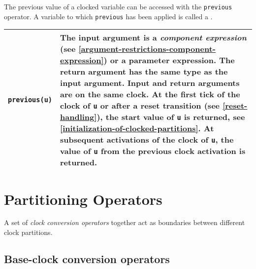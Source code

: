 The previous value of a clocked variable can be accessed with the \lstinline!previous! operator.  A variable to which \lstinline!previous! has been applied is called a .

\begin{longtable}[]{|l|p{12cm}|}
\hline \endhead
\lstinline!previous(u)! &
The input argument is a \emph{component expression} (see \cref{argument-restrictions-component-expression}) or a parameter expression.  The return argument has the same type as the input argument.
Input and return arguments are on the same clock.  At the first tick of the clock of \lstinline!u! or after a reset transition (see \cref{reset-handling}), the start value of \lstinline!u! is
returned, see \cref{initialization-of-clocked-partitions}.  At subsequent activations of the clock of \lstinline!u!, the value of \lstinline!u! from the previous clock activation is returned.\\
\hline
\end{longtable}

\section{Partitioning Operators}\label{partitioning-operators}

A set of \emph{clock conversion operators} together act as boundaries
between different clock partitions.

\subsection{Base-clock conversion operators}\label{base-clock-conversion-operators}

